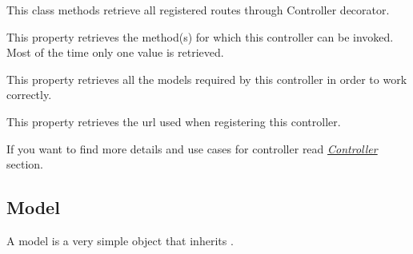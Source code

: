 \documentclass[letterpaper,10pt,english]{sphinxmanual}
\begin{document}
\begin{fulllineitems}

\begin{fulllineitems}
\label{features/mvc:fantastico.mvc.controller_decorators.Controller.get_registered_routes}
This class methods retrieve all registered routes through Controller decorator.

\end{fulllineitems}


\begin{fulllineitems}
\label{features/mvc:fantastico.mvc.controller_decorators.Controller.method}
This property retrieves the method(s) for which this controller can be invoked. Most of the time only one value is
retrieved.

\end{fulllineitems}


\begin{fulllineitems}
\label{features/mvc:fantastico.mvc.controller_decorators.Controller.models}
This property retrieves all the models required by this controller in order to work correctly.

\end{fulllineitems}


\begin{fulllineitems}
\label{features/mvc:fantastico.mvc.controller_decorators.Controller.url}
This property retrieves the url used when registering this controller.

\end{fulllineitems}


\end{fulllineitems}


If you want to find more details and use cases for controller read {\hyperref[features/mvc:core-controller-section]{\emph{Controller}}} section.


\subsection{Model}
\label{features/mvc:model}
A model is a very simple object that inherits .
\end{document}
